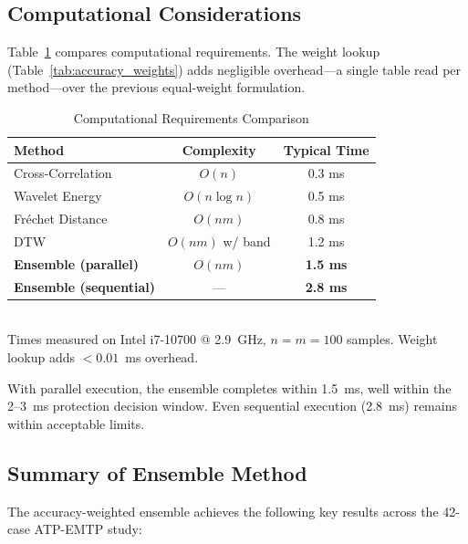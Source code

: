 \documentclass[journal]{IEEEtran}
\begin{document}
\subsection{Computational Considerations}

Table~\ref{tab:computational} compares computational requirements.
The weight lookup (Table~\ref{tab:accuracy_weights}) adds negligible
overhead---a single table read per method---over the previous
equal-weight formulation.

\begin{table}[!t]
\centering
\caption{Computational Requirements Comparison}
\label{tab:computational}
\begin{tabular}{@{}lcc@{}}
\toprule
\textbf{Method} & \textbf{Complexity} & \textbf{Typical Time} \\
\midrule
Cross-Correlation & $O(n)$        & 0.3 ms \\
Wavelet Energy    & $O(n\log n)$  & 0.5 ms \\
Fr\'{e}chet Distance & $O(nm)$   & 0.8 ms \\
DTW               & $O(nm)$ w/ band & 1.2 ms \\
\midrule
\textbf{Ensemble (parallel)}   & $O(nm)$ & \textbf{1.5 ms} \\
\textbf{Ensemble (sequential)} & ---     & \textbf{2.8 ms} \\
\bottomrule
\end{tabular}
\\[0.5em]
\footnotesize{Times measured on Intel i7-10700 @ 2.9~GHz,
$n = m = 100$ samples. Weight lookup adds $<\!0.01$~ms overhead.}
\end{table}

With parallel execution, the ensemble completes within 1.5~ms, well
within the 2--3~ms protection decision window. Even sequential
execution (2.8~ms) remains within acceptable limits.

\subsection{Summary of Ensemble Method}

The accuracy-weighted ensemble achieves the following key results
across the 42-case ATP-EMTP study:
\end{document}
